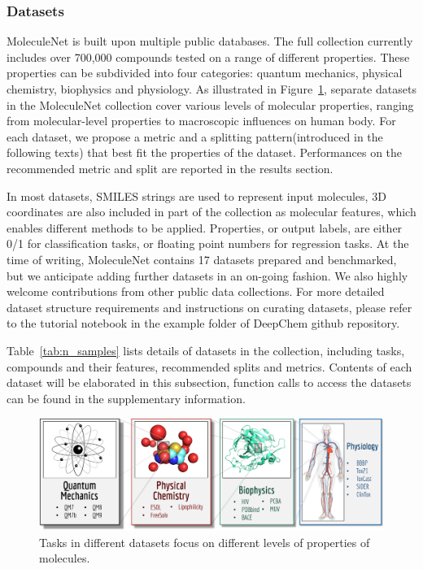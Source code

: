 \subsubsection{Datasets}
MoleculeNet is built upon multiple public databases. The full collection currently includes over 700,000 compounds tested on a range of different properties. These properties can be subdivided into four categories: quantum mechanics, physical chemistry, biophysics and physiology. As illustrated in Figure~\ref{fig:dataset_composition}, separate datasets in the MoleculeNet collection cover various levels of molecular properties, ranging from molecular-level properties to macroscopic influences on human body. For each dataset, we propose a metric and a splitting pattern(introduced in the following texts) that best fit the properties of the dataset. Performances on the recommended metric and split are reported in the results section.

In most datasets, SMILES strings\cite{SMILES} are used to represent input molecules, 3D coordinates are also included in part of the collection as molecular features, which enables different methods to be applied. Properties, or output labels, are either 0/1 for classification tasks, or floating point numbers for regression tasks. At the time of writing, MoleculeNet contains 17 datasets prepared and benchmarked, but we anticipate adding further datasets in an on-going fashion. We also highly welcome contributions from other public data collections. For more detailed dataset structure requirements and instructions on curating datasets, please refer to the tutorial notebook in the example folder of DeepChem github repository.

Table~\ref{tab:n_samples} lists details of datasets in the collection, including tasks, compounds and their features, recommended splits and metrics. Contents of each dataset will be elaborated in this subsection, function calls to access the datasets can be found in the supplementary information\dag.

\begin{figure}[h]
  \centering
  \includegraphics[width=.85\textwidth]{Images/dataset_composition.png}
  \caption{Tasks in different datasets focus on different levels of properties of molecules.}
  \label{fig:dataset_composition}
\end{figure}

